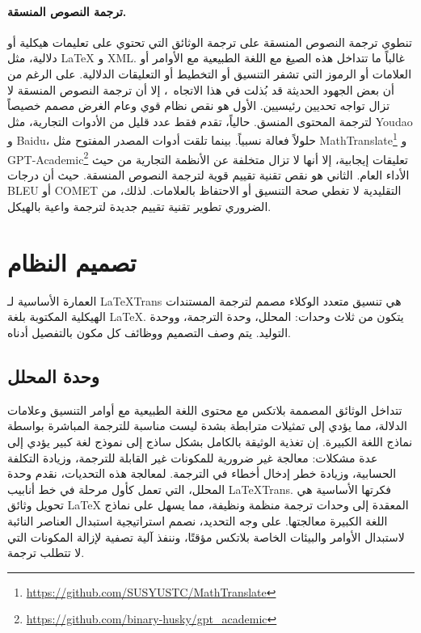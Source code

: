 \documentclass[11pt]{article}
\begin{document}
\paragraph{ترجمة النصوص المنسقة.}
تنطوي ترجمة النصوص المنسقة على ترجمة الوثائق التي تحتوي على تعليمات هيكلية أو دلالية، مثل LaTeX و XML. غالباً ما تتداخل هذه الصيغ مع اللغة الطبيعية مع الأوامر أو العلامات أو الرموز التي تشفر التنسيق أو التخطيط أو التعليقات الدلالية. على الرغم من أن بعض الجهود الحديثة قد بُذلت في هذا الاتجاه~\cite{kleidermacher2025sciencelanguagesassessingllm,khan2025xmljson}، إلا أن ترجمة النصوص المنسقة لا تزال تواجه تحديين رئيسيين. الأول هو نقص نظام قوي وعام الغرض مصمم خصيصاً لترجمة المحتوى المنسق. حالياً، تقدم فقط عدد قليل من الأدوات التجارية، مثل Youdao و Baidu، حلولاً فعالة نسبياً. بينما تلقت أدوات المصدر المفتوح مثل MathTranslate\footnote{\url{https://github.com/SUSYUSTC/MathTranslate}} و GPT-Academic\footnote{\url{https://github.com/binary-husky/gpt\_academic}} تعليقات إيجابية، إلا أنها لا تزال متخلفة عن الأنظمة التجارية من حيث الأداء العام. 
الثاني هو نقص تقنية تقييم قوية لترجمة النصوص المنسقة. حيث أن درجات BLEU أو COMET التقليدية لا تغطي صحة التنسيق أو الاحتفاظ بالعلامات. لذلك، من الضروري تطوير تقنية تقييم جديدة لترجمة واعية بالهيكل.
\section{تصميم النظام}
\label{sec:system}
العمارة الأساسية لـ LaTeXTrans هي تنسيق متعدد الوكلاء مصمم لترجمة المستندات الهيكلية المكتوبة بلغة LaTeX. يتكون من ثلاث وحدات: المحلل، وحدة الترجمة، ووحدة التوليد. يتم وصف التصميم ووظائف كل مكون بالتفصيل أدناه.
\subsection{وحدة المحلل}
\label{sec:parser}
تتداخل الوثائق المصممة بلاتكس مع محتوى اللغة الطبيعية مع أوامر التنسيق وعلامات الدلالة، مما يؤدي إلى تمثيلات مترابطة بشدة ليست مناسبة للترجمة المباشرة بواسطة نماذج اللغة الكبيرة. إن تغذية الوثيقة بالكامل بشكل ساذج إلى نموذج لغة كبير يؤدي إلى عدة مشكلات: معالجة غير ضرورية للمكونات غير القابلة للترجمة، وزيادة التكلفة الحسابية، وزيادة خطر إدخال أخطاء في الترجمة. 
لمعالجة هذه التحديات، نقدم وحدة المحلل، التي تعمل كأول مرحلة في خط أنابيب LaTeXTrans. فكرتها الأساسية هي تحويل وثائق LaTeX المعقدة إلى وحدات ترجمة منظمة ونظيفة، مما يسهل على نماذج اللغة الكبيرة معالجتها. على وجه التحديد، نصمم استراتيجية استبدال العناصر النائبة لاستبدال الأوامر والبيئات الخاصة بلاتكس مؤقتًا، وننفذ آلية تصفية لإزالة المكونات التي لا تتطلب ترجمة.
\end{document}
